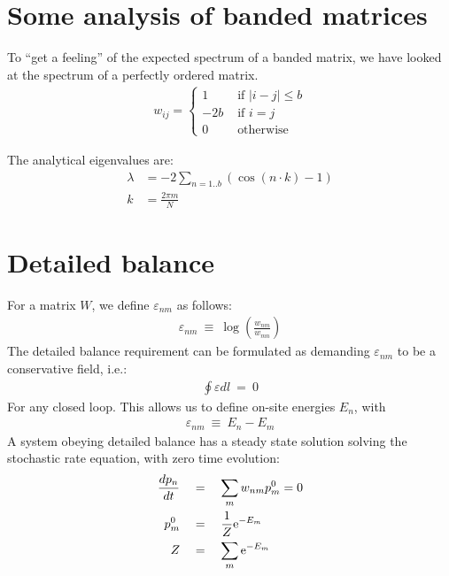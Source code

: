 \section{Some analysis of banded matrices}

To ``get a feeling'' of the expected spectrum of a banded matrix,
we have looked at the spectrum of a perfectly ordered matrix.
\begin{align}
  w_{ij} = 
  \begin{cases}
    1 \quad &\textrm{  if  } |i-j|\le b   \\
    -2 b &\textrm{  if  } i = j  \\
    0 \quad &\textrm{  otherwise }
  \end{cases}
\end{align}

The analytical eigenvalues are:
\begin{align}
  \lambda &= -2\sum_{n=1..b} (\cos(n\cdot k) -1) \\
  k &= \frac{2\pi m}{N}
\end{align}

\section{Detailed balance}\label{sec:detailed_balance}

For a matrix $W$, we define $\varepsilon_{nm}$ as follows:
%
\begin{align}\label{eq:epsilon}
\varepsilon_{nm}\ \equiv\ \log\left(\frac{w_{nm}}{w_{mn}}\right)
\end{align}
%
The detailed balance requirement can be formulated as demanding $\varepsilon_{nm}$ 
to be a conservative field, i.e.:
%
\begin{align}
\oint \varepsilon dl \ =\ 0
\end{align}
%
For any closed loop. This allows us to define
on-site energies $E_n$, with
%
\begin{align}
 \varepsilon_{nm}\ \equiv\ E_n-E_m
\end{align}
%
A system obeying detailed balance
has a steady state solution solving the stochastic rate equation, 
with zero time evolution:
%
\begin{align}
   \frac{dp_n}{dt} \quad &= \quad \sum_m w_{nm}p_m^0 = 0\\
   p_m^0 \quad &= \quad \frac{1}{Z}\mbox{e}^{-E_m} \\
   Z     \quad &= \quad \sum_m \mbox{e}^{-E_m}
\end{align}
%



